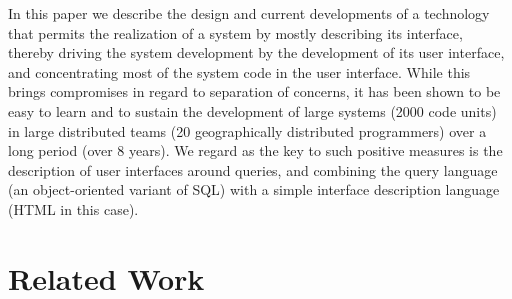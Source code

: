 \documentclass{chi2009}
\begin{document}
In this paper we describe the design and current developments of a technology that permits the realization of a system by mostly describing its interface, thereby driving the system development by the development of its user interface, and concentrating most of the system code in the user interface. While this brings compromises in regard to separation of concerns, it has been shown to be easy to learn and to sustain the development of large systems (2000 code units) in large distributed teams (20 geographically distributed programmers) over a long period (over 8 years). We regard as the key to such positive measures is the description of user interfaces around queries, and combining the query language (an object-oriented variant of SQL) with a simple interface description language (HTML in this case). 


\section{Related Work}\label{sec:related}

\end{document}
